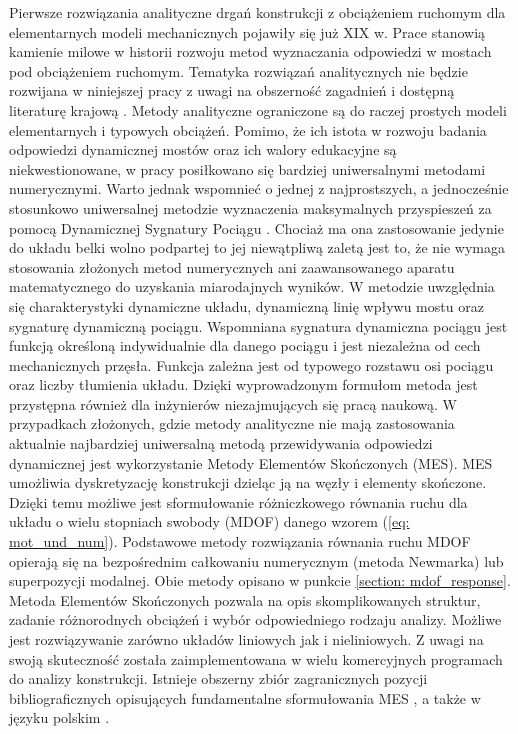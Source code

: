 Pierwsze rozwiązania analityczne drgań konstrukcji z obciążeniem ruchomym dla elementarnych modeli mechanicznych pojawiły się już XIX w. Prace \parencite{Willis1849,Stokes1849,Saller1921,Timoshenko1922,Inglis1934,Kolousek1973} stanowią kamienie milowe w historii rozwoju metod wyznaczania odpowiedzi w mostach pod obciążeniem ruchomym. Tematyka rozwiązań analitycznych nie będzie rozwijana w niniejszej pracy z uwagi na obszerność zagadnień i dostępną literaturę krajową \parencite{Szczesniak2018}. Metody analityczne ograniczone są do raczej prostych modeli elementarnych i typowych obciążeń. Pomimo, że ich istota w rozwoju badania odpowiedzi dynamicznej mostów oraz ich walory edukacyjne są niekwestionowane, w pracy posiłkowano się bardziej uniwersalnymi metodami numerycznymi. Warto jednak wspomnieć o jednej z najprostszych, a jednocześnie stosunkowo uniwersalnej metodzie wyznaczenia maksymalnych przyspieszeń za pomocą Dynamicznej Sygnatury Pociągu  \parencite{Goicolea2008a,ERRI1998}. Chociaż ma ona zastosowanie jedynie do układu belki wolno podpartej to jej niewątpliwą zaletą jest to, że nie wymaga stosowania złożonych metod numerycznych ani zaawansowanego aparatu matematycznego do uzyskania miarodajnych wyników. W metodzie uwzględnia się charakterystyki dynamiczne układu, dynamiczną linię wpływu mostu  oraz sygnaturę dynamiczną pociągu. Wspomniana sygnatura dynamiczna pociągu jest funkcją określoną indywidualnie dla danego pociągu i jest niezależna od cech mechanicznych przęsła. Funkcja zależna jest od typowego rozstawu osi pociągu oraz liczby tłumienia układu. Dzięki wyprowadzonym formułom metoda jest przystępna również dla inżynierów niezajmujących się pracą naukową.
W przypadkach złożonych, gdzie metody analityczne nie mają zastosowania aktualnie najbardziej uniwersalną metodą przewidywania odpowiedzi dynamicznej jest wykorzystanie Metody Elementów Skończonych (MES). MES umożliwia dyskretyzację konstrukcji dzieląc ją na węzły i elementy skończone. Dzięki temu możliwe jest sformułowanie różniczkowego równania ruchu dla układu o wielu stopniach swobody (MDOF) danego wzorem (\ref{eq: mot_und_num}). Podstawowe metody rozwiązania równania ruchu MDOF opierają się na bezpośrednim całkowaniu numerycznym (metoda Newmarka) lub superpozycji modalnej. Obie metody opisano w punkcie \ref{section: mdof_response}. Metoda Elementów Skończonych pozwala na opis skomplikowanych struktur, zadanie różnorodnych obciążeń i wybór odpowiedniego rodzaju analizy. Możliwe jest rozwiązywanie zarówno układów liniowych jak i nieliniowych. Z uwagi na swoją skuteczność została zaimplementowana w wielu komercyjnych programach do analizy konstrukcji. Istnieje obszerny zbiór zagranicznych pozycji bibliograficznych opisujących fundamentalne sformułowania MES \parencite{Zienkiewicz2005,Hughes1987,Langtangen2019,Hartmann2007}, a także w języku polskim \parencite{Kleiber1985,Rakowski2016}. 


